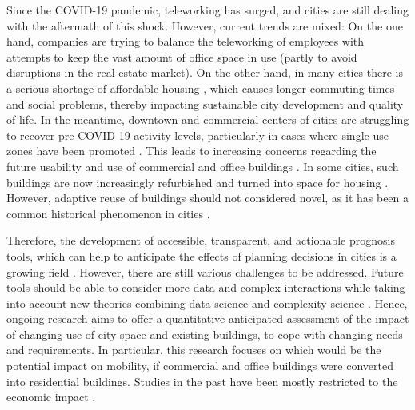 Since the COVID-19 pandemic, teleworking has surged, and cities are still dealing with the aftermath of this shock. However, current trends are mixed: On the one hand, companies are trying to balance the teleworking of employees with attempts to keep the vast amount of office space in use (partly to avoid disruptions in the real estate market). On the other hand, in many cities there is a serious shortage of affordable housing \citep{Myers2021}, which causes longer commuting times and social problems, thereby impacting sustainable city development and quality of life. In the meantime, downtown and commercial centers of cities are struggling to recover pre-COVID-19 activity levels, particularly in cases where single-use zones have been promoted \citep{Chapple2023TheCities}. This leads to increasing concerns regarding the future usability and use of commercial and office buildings
. In some cities, such buildings are now increasingly refurbished and turned into space for housing \citep{2023The2023, AjuntamentdeBarcelona2024, Frei2023a, Schneebeli2021a, Rohwetter, Tagesschau, Bloomberg2021a, Meyer2024a}. However, adaptive reuse of buildings should not considered novel, as it has been a common historical phenomenon in cities \citep{Remy2014}.


Therefore, the development of accessible, transparent, and actionable prognosis tools, which can help to anticipate the effects of planning decisions in cities is a growing field \citep{Batty2018}. However, there are still various challenges to be addressed. Future tools should be able to consider more data and complex interactions while taking into account new theories combining data science and complexity science \citep{Caldarelli2023}. 
Hence, ongoing research aims to offer a quantitative anticipated assessment of the impact of changing use 
of city space and existing buildings, to cope with changing needs and requirements. In particular, this research focuses on which would be the potential impact on mobility, if commercial and office buildings were converted into residential buildings. Studies in the past have been mostly restricted to the economic impact \citep{2023The2023, Remy2014}.

